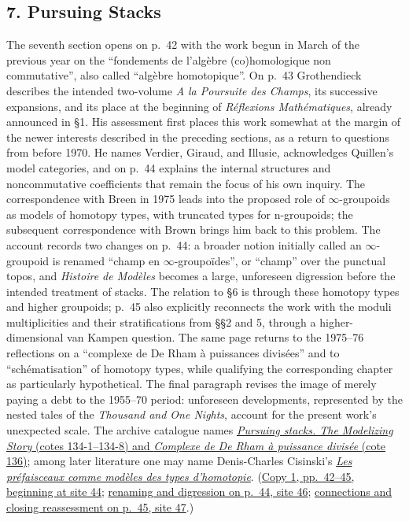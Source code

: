 \documentclass[11pt,a4paper]{article}
\begin{document}
\subsection*{7. Pursuing Stacks}
The seventh section opens on p.~42 with the work begun in March of the
previous year on the ``fondements de l'algèbre (co)homologique non
commutative'', also called ``algèbre homotopique''. On p.~43 Grothendieck
describes the intended two-volume \emph{A la Poursuite des Champs}, its
successive expansions, and its place at the beginning of
\emph{Réflexions Mathématiques}, already announced in \S1. His assessment
first places this work somewhat at the margin of the newer interests
described in the preceding sections, as a return to questions from before
1970. He names Verdier, Giraud, and Illusie, acknowledges Quillen's model
categories, and on p.~44 explains the internal structures and
noncommutative coefficients that remain the focus of his own inquiry.
The correspondence with Breen in 1975 leads into the proposed role of
$\infty$-groupoids as models of homotopy types, with truncated types for
n-groupoids; the subsequent correspondence with Brown brings him back
to this problem. The account records two changes on p.~44: a broader
notion initially called an $\infty$-groupoid is renamed ``champ en
$\infty$-groupoïdes'', or ``champ'' over the punctual topos, and
\emph{Histoire de Modèles} becomes a large, unforeseen digression before
the intended treatment of stacks. The relation to \S6 is through these
homotopy types and higher groupoids; p.~45 also explicitly reconnects the
work with the moduli multiplicities and their stratifications from
\S\S2 and 5, through a higher-dimensional van Kampen question. The same
page returns to the 1975--76 reflections on a ``complexe de De Rham à
puissances divisées'' and to ``schématisation'' of homotopy types, while
qualifying the corresponding chapter as particularly hypothetical.
The final paragraph revises the image of merely paying a debt to the
1955--70 period: unforeseen developments, represented by the nested tales
of the \emph{Thousand and One Nights}, account for the present work's
unexpected scale. The archive catalogue names
\href{https://grothendieck.umontpellier.fr/archives-grothendieck/}{\emph{Pursuing stacks. The Modelizing Story} (cotes 134-1--134-8) and \emph{Complexe de De Rham à puissance divisée} (cote 136)};
among later literature one may name Denis-Charles Cisinski's
\href{https://smf.emath.fr/publications/les-prefaisceaux-comme-modeles-des-types-dhomotopie}{\emph{Les préfaisceaux comme modèles des types d'homotopie}}.
(\href{https://grothendieck.umontpellier.fr/web/viewer.html?file=../119.pdf\#page=45}{Copy 1, pp.~42--45, beginning at site 44};
\href{https://grothendieck.umontpellier.fr/web/viewer.html?file=../119.pdf\#page=47}{renaming and digression on p.~44, site 46};
\href{https://grothendieck.umontpellier.fr/web/viewer.html?file=../119.pdf\#page=48}{connections and closing reassessment on p.~45, site 47}.)
\end{document}
